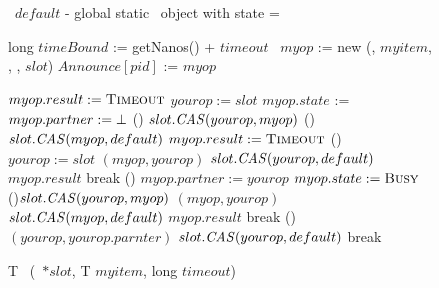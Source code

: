 \begin{figure*}
	\small
	
	\exInfo\ $default$ - global static \exInfo\ object with state = \emptyst
	
\begin{algorithm}[H]
	\caption{T \exchange\ (\exInfo\ $*slot$, T $myitem$, long $timeout$)}
	
	long $timeBound$ := getNanos() + $timeout$ \;
	\exInfo\ $myop$ := new \exInfo (\waiting, $myitem$, \init, \init, $slot$)\;
	$Announce[pid]$ := $myop$ \;
	
	\While{\True} {
		 {
			$myop.result := \mbox{\sc Timeout}$ 
			\KwRet \timeout 
		}
		$yourop := slot$ \;
		 {
			\uCase{\emptyst} {
				$myop.state$ := \waiting {}
				$myop.partner := \mbox{$\bot$}$ \;
				\If () {$slot.\mbox{\textit{CAS}} (yourop, myop)$ \label{exchage-waiting-cas}} {
					\uIf () {$slot.\mbox{\textit{CAS}}(myop, default)$}{
						$myop.result := \mbox{\sc Timeout}$ \;
						\KwRet \timeout\;
					} \uElse () {
						$yourop := slot$ \;
						 {
							\switchPair $(myop, yourop)$ 
							$slot.\mbox{\textit{CAS}} (yourop, default)$ 
						}
						\KwRet $myop.result$ \;
					}
				}
				break \;
			}
			\uCase (){\waiting} {
				$myop.partner := yourop$ 
				$myop.state := \mbox{\sc Busy}$ \;
				\uIf (){$slot.\mbox{\textit{CAS}} (yourop, myop)$ \label{exchange-busy-cas}} {
					\switchPair $(myop, yourop)$ 
					$slot.\mbox{\textit{CAS}} (myop, default)$ 
					\KwRet $myop.result$ \;
				}
				break \;
			}
			\uCase () {\busy} {
				\switchPair $(yourop, yourop.parnter)$ 
				$slot.\mbox{\textit{CAS}} (yourop, default)$ 
				break \;
			}
		}	
	} 
\end{algorithm}

\end{figure*}





